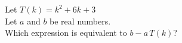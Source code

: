 \documentclass{ximera}
\begin{document}
\begin{exercise}
\begin{question}
\end{question}








\begin{question}
Let $T(k) = k^2 + 6k + 3$ \\

Let $a$ and $b$ be real numbers. \\

Which expression is equivalent to $b - a \, T(k)$?


\begin{multipleChoice}
\end{multipleChoice}

\end{question}







\end{exercise}
\end{document}
